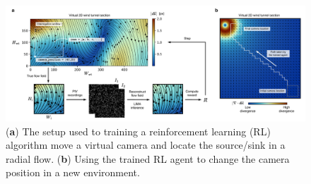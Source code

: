 \documentclass[a4paper,fleqn]{cas-dc}
\begin{document}
\begin{figure}[t]
\centering
\vspace{-0.4 in}
\includegraphics[width=\textwidth]{RL.pdf}
\vspace{10 pt}
\caption{\footnotesize (\textbf{a}) The setup used to training a reinforcement learning (RL) algorithm move a virtual camera and locate the source/sink in a radial flow. (\textbf{b}) Using the trained RL agent to change the camera position in a new environment.}
\label{fig:RL}
\end{figure}
\end{document}
